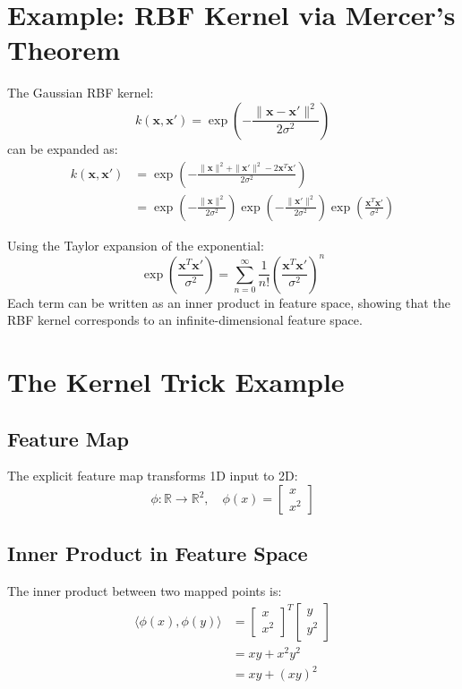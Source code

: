 \documentclass{tufte-handout}
\begin{document}
\section{Example: RBF Kernel via Mercer's Theorem}

The Gaussian RBF kernel:
\begin{equation}
k(\mathbf{x}, \mathbf{x}') = \exp\left(-\frac{\|\mathbf{x} - \mathbf{x}'\|^2}{2\sigma^2}\right)
\end{equation}
can be expanded as:
\begin{align}
k(\mathbf{x}, \mathbf{x}') &= \exp\left(-\frac{\|\mathbf{x}\|^2 + \|\mathbf{x}'\|^2 - 2\mathbf{x}^T\mathbf{x}'}{2\sigma^2}\right) \\
&= \exp\left(-\frac{\|\mathbf{x}\|^2}{2\sigma^2}\right) \exp\left(-\frac{\|\mathbf{x}'\|^2}{2\sigma^2}\right) \exp\left(\frac{\mathbf{x}^T\mathbf{x}'}{\sigma^2}\right)
\end{align}

Using the Taylor expansion of the exponential:
\begin{equation}
\exp\left(\frac{\mathbf{x}^T\mathbf{x}'}{\sigma^2}\right) = \sum_{n=0}^{\infty} \frac{1}{n!}\left(\frac{\mathbf{x}^T\mathbf{x}'}{\sigma^2}\right)^n
\end{equation}
Each term can be written as an inner product in feature space, showing that the RBF kernel corresponds to an infinite-dimensional feature space.

\section{The Kernel Trick Example}

\subsection{Feature Map}
The explicit feature map transforms 1D input to 2D:
\[
\phi: \mathbb{R} \to \mathbb{R}^2, \quad \phi(x) = \begin{bmatrix} x \\ x^2 \end{bmatrix}
\]

\subsection{Inner Product in Feature Space}
The inner product between two mapped points is:
\begin{align}
\langle \phi(x), \phi(y) \rangle &= \begin{bmatrix} x \\ x^2 \end{bmatrix}^T \begin{bmatrix} y \\ y^2 \end{bmatrix} \\
&= xy + x^2y^2 \\
&= xy + (xy)^2
\end{align}
\end{document}
